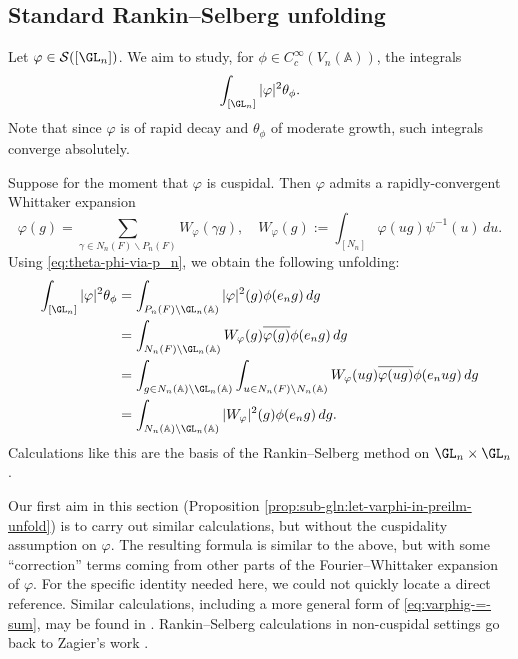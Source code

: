 \subsection{Standard Rankin--Selberg unfolding}\label{sec:stand-rank-selb}
Let $\varphi \in \mathcal{S}([\GL_n])$.  We aim to study, for $\phi \in C_c^\infty(V_n(\mathbb{A}))$, the integrals
\begin{equation*}
  \int_{[\GL_n]} |\varphi|^2 \theta_\phi.
\end{equation*}
Note that since $\varphi$ is of rapid decay and $\theta_\phi$ of moderate growth, such integrals converge absolutely.

Suppose for the moment that $\varphi$ is cuspidal.  Then $\varphi$ admits a rapidly-convergent Whittaker expansion \cite[Thm 5.9]{MR348047}
\begin{equation}\label{eq:varphig-=-sum}
  \varphi(g) = \sum_{\gamma \in N_n(F) \backslash P_n(F) } W_{\varphi}(\gamma g),
  \quad
  W_{\varphi}(g) := \int_{[N_n]}
  \varphi(u g) \psi^{-1}(u) \, d u.
\end{equation}
Using \eqref{eq:theta-phi-via-p_n}, we obtain the following unfolding:
\begin{align*}
  \int_{[\GL_n]} |\varphi|^2 \theta_\phi  &=
                            \int_{P_n(F) \backslash \GL_n(\mathbb{A})}|\varphi|^2(g) \phi(e_n g) \, d g \\
                          &=
                            \int_{N_n(F) \backslash \GL_n(\mathbb{A})} W_{\varphi}(g) \overline{\varphi(g)} \phi(e_n g) \, d g \\
                          &=
                            \int_{g \in N_n(\mathbb{A}) \backslash \GL_n(\mathbb{A})}
                            \int_{u \in N_n(F) \backslash N_n(\mathbb{A})}
                            W_{\varphi}(u g) \overline{\varphi(u g)} \phi(e_n u g) \, d g \\
                          &=
                            \int_{N_n(\mathbb{A}) \backslash \GL_n(\mathbb{A})} |W_{\varphi}|^2(g) \phi(e_n g) \, d g.
\end{align*}
Calculations like this are the basis of the Rankin--Selberg method on $\GL_n \times \GL_n$ \cite{MR701565, MR618323}.

Our first aim in this section (Proposition \ref{prop:sub-gln:let-varphi-in-preilm-unfold}) is to carry out similar calculations, but without the cuspidality assumption on $\varphi$.  The resulting formula is similar to the above, but with some ``correction'' terms coming from other parts of the Fourier--Whittaker expansion of $\varphi$.  For the specific identity needed here, we could not quickly locate a direct reference.  Similar calculations, including a more general form of \eqref{eq:varphig-=-sum}, may be found in \cite[Prop 4.2]{MR3334892}.  Rankin--Selberg calculations in non-cuspidal settings go back to Zagier's work \cite{MR656029}.

